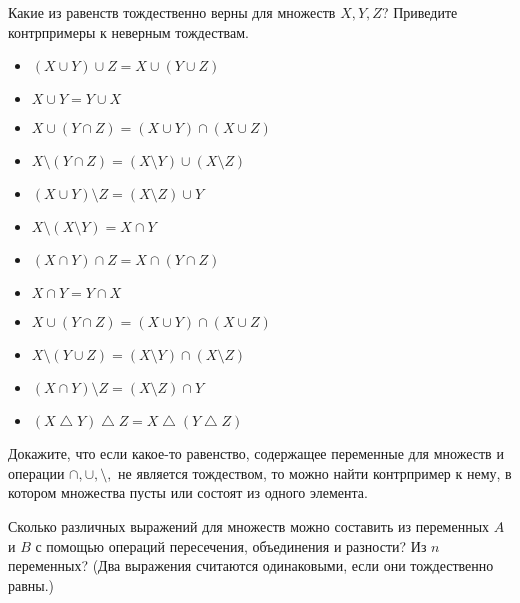 \documentclass{article}
\theoremstyle{remark}
\begin{document}
\begin{task} 
	Какие из равенств тождественно верны для множеств $X,Y,Z$? Приведите контрпримеры к неверным тождествам.
	\newline
	
	\begin{minipage}[c]{0.5\textwidth}
		\begin{itemize}
			\item $(X \cup Y) \cup Z = X \cup (Y \cup Z)$
			\item $X \cup Y = Y \cup X$
			\item $X \cup (Y \cap Z) = (X \cup Y) \cap (X \cup Z)$
			\item $X \setminus (Y \cap Z) = (X \setminus Y) \cup (X \setminus Z)$
			\item $(X \cup Y) \setminus Z = (X \setminus Z) \cup Y$
			\item $X \setminus (X \setminus Y) = X \cap Y$
		\end{itemize}
	\end{minipage}
	\begin{minipage}[c]{0.5\textwidth}
		\begin{itemize}
			\item $(X \cap Y) \cap Z = X \cap (Y \cap Z)$
			\item $X \cap Y = Y \cap X$
			\item $X \cup (Y \cap Z) = (X \cup Y) \cap (X \cup Z)$
			\item $X \setminus (Y \cup Z) = (X \setminus Y) \cap (X \setminus Z)$
			\item $(X \cap Y) \setminus Z = (X \setminus Z) \cap Y$
			\item $(X \bigtriangleup Y) \bigtriangleup Z = X \bigtriangleup (Y \bigtriangleup Z)$
		\end{itemize}
	\end{minipage}
\end{task}
	
\begin{task}
	Докажите, что если какое-то равенство, содержащее переменные для множеств и операции $\cap, \cup, \setminus,$ не является тождеством, то можно найти контрпример к нему, в котором множества пусты или состоят из одного элемента.
\end{task}

\begin{task}[*]
Сколько различных выражений для множеств можно составить из переменных $A$  и $B$ с помощью операций пересечения, объединения и разности? Из $n$ переменных? (Два выражения считаются одинаковыми, если они тождественно равны.)
\end{task}
\end{document}
